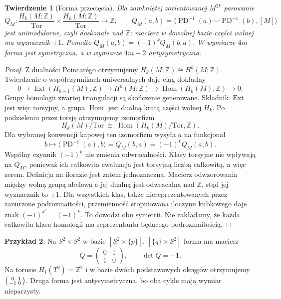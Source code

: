 \documentclass[11pt,a4paper,oneside]{report}
\newcommand{\Z}{\mathbb{Z}}
\theoremstyle{plain}
\newtheorem{twierdzenie}{Twierdzenie}[section]
\theoremstyle{definition}
\newtheorem{przyklad}[twierdzenie]{Przykład}
\theoremstyle{remark}
\begin{document}
\begin{twierdzenie}[Forma przecięcia]
\label{thm:forma-przeciecia-16}
Dla zamkniętej
zorientowanej
$M^{2k}$ parowanie
\[
 Q_M:
 \frac{H_k(M;\Z)}{\mathrm{Tor}}
 \times
 \frac{H_k(M;\Z)}{\mathrm{Tor}}
   \longrightarrow\Z,
 \qquad
 Q_M(a,b)=
 \langle\operatorname{PD}^{-1}(a)
 \smile\operatorname{PD}^{-1}(b),[M]\rangle
\]
jest \emph{unimodularne}, czyli doskonałe nad $\Z$:
macierz w dowolnej bazie
części wolnej ma wyznacznik
$\pm1$. Ponadto
$Q_M(a,b)=(-1)^kQ_M(b,a)$.
W wymiarze $4m$ forma
jest symetryczna, a
w wymiarze $4m+2$
antysymetryczna.
\end{twierdzenie}
\begin{proof}
Z dualności Poincarégo
otrzymujemy
$H_k(M;\Z)\cong H^k(M;\Z)$.
Twierdzenie o
współczynnikach
uniwersalnych daje
ciąg dokładny
\[
0\longrightarrow
 \operatorname{Ext}
     (H_{k-1}(M),\Z)
 \longrightarrow H^k(M;\Z)
 \longrightarrow
 \operatorname{Hom}(H_k(M),\Z)
 \longrightarrow0.
\]
Grupy homologii
zwartej triangulacji
są skończenie
generowane.
Składnik $\operatorname{Ext}$
jest więc torsyjny,
a grupa $\operatorname{Hom}$
jest dualną kratą
części wolnej $H_k$.
Po podzieleniu przez
torsję otrzymujemy
izomorfizm
\[
 H_k(M)/\mathrm{Tor}
 \ \cong\
 \operatorname{Hom}
    (H_k(M)/\mathrm{Tor},\Z).
\]
Dla wybranej konwencji kapowej ten izomorfizm
wysyła $a$ na funkcjonał
\[
 b\longmapsto\langle\operatorname{PD}^{-1}(a),b\rangle
 =Q_M(b,a)=(-1)^kQ_M(a,b).
\]
Wspólny czynnik $(-1)^k$ nie zmienia odwracalności.
Klasy torsyjne nie wpływają na $Q_M$, ponieważ
ich całkowita ewaluacja jest torsyjną liczbą całkowitą,
a więc zerem. Definicja na ilorazie jest zatem jednoznaczna.
Macierz odwzorowania
między wolną grupą
abelową a jej dualną
jest odwracalna nad
$\Z$, stąd jej
wyznacznik to $\pm1$.
Dla wszystkich klas, także niereprezentowanych
przez zanurzone podrozmaitości, przemienność
stopniowana iloczynu kubkowego daje znak
$(-1)^{k^2}=(-1)^k$. To dowodzi obu symetrii.
Nie zakładamy, że każda całkowita klasa homologii
ma reprezentanta będącego podrozmaitością.
\end{proof}

\begin{przyklad}
Na $S^2\times S^2$
w bazie
$[S^2\times\{p\}]$,
$[\{q\}\times S^2]$
forma ma macierz
\[
 Q=
 \begin{pmatrix}
  0&1\\1&0
 \end{pmatrix},
 \qquad\det Q=-1.
\]
Na torusie
$H_1(T^2)=\Z^2$
i w bazie dwóch
podstawowych okręgów
otrzymujemy
$\begin{psmallmatrix}
0&1\\-1&0
\end{psmallmatrix}$.
Druga forma jest
antysymetryczna,
bo oba cykle mają
wymiar nieparzysty.
\end{przyklad}
\end{document}
